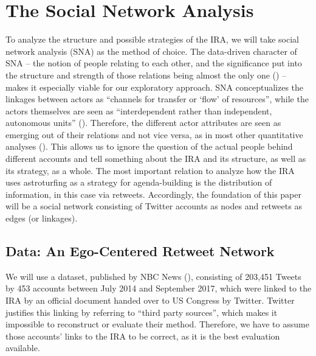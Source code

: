\documentclass[12pt, titlepage=true, toc=bib]{scrartcl}
\begin{document}
\section{The Social Network Analysis}

To analyze the structure and possible strategies of the IRA, we will take social network analysis (SNA) as the method of choice. The data-driven character of SNA -- the notion of people relating to each other, and the significance put into the structure and strength of those relations being almost the only one (\cite[982]{golovchenko_state_2018}) -- makes it especially viable for our exploratory approach. SNA conceptualizes the linkages between actors as \enquote{channels for transfer or \enquote{flow} of resources}, while the actors themselves are seen as ``interdependent rather than independent, autonomous units'' (\cite[4]{wasserman_social_1994}). Therefore, the different actor attributes are seen as emerging out of their relations and not vice versa, as in most other quantitative analyses (\cite[8]{wasserman_social_1994}). This allows us to ignore the question of the actual people behind different accounts and tell something about the IRA and its structure, as well as its strategy, as a whole. The most important relation to analyze how the IRA uses astroturfing as a strategy for agenda-building is the distribution of information, in this case via retweets. Accordingly, the foundation of this paper will be a social network consisting of Twitter accounts as nodes and retweets as edges (or linkages).


\subsection{Data: An Ego-Centered Retweet Network}

We will use a dataset, published by NBC News (\cite*{popken_twitter_2018}), consisting of 203,451 Tweets by 453 accounts between July 2014 and September 2017, which were linked to the IRA by an official document handed over to US Congress by Twitter. Twitter justifies this linking by referring to ``third party sources'', which makes it impossible to reconstruct or evaluate their method. Therefore, we have to assume those accounts' links to the IRA to be correct, as it is the best evaluation available.
\end{document}
